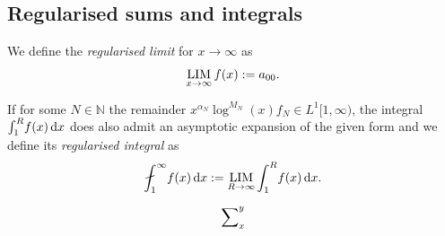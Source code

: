 \subsection{Regularised sums and integrals}

We define the \emph{regularised limit} for $x\to\infty$ as
\begin{align}
  \Reglim_{x\to\infty} f(x) := a_{00}.
\end{align}

If for some $N\in\mathbb{N}$ the remainder $x^{\alpha_N}\log^{M_N}(x)f_N\in
L^1[1,\infty)$, the integral $\Integ[R]{1}{x}{f(x)}$ does also admit an
asymptotic expansion of the given form and we define its \emph{regularised
integral} as
\begin{align}
  \Regint{x}{f(x)} := \Reglim_{R\to\infty}\Integ[R]{1}{x}{f(x)}.
\end{align}

\begin{align}
  \Regsum_x^y
\end{align}
